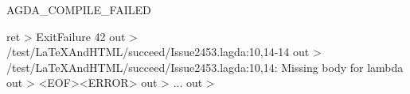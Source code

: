 AGDA_COMPILE_FAILED

ret > ExitFailure 42 out > /test/LaTeXAndHTML/succeed/Issue2453.lagda:10,14-14 out > /test/LaTeXAndHTML/succeed/Issue2453.lagda:10,14: Missing body for lambda out > <EOF><ERROR> out > ... out >